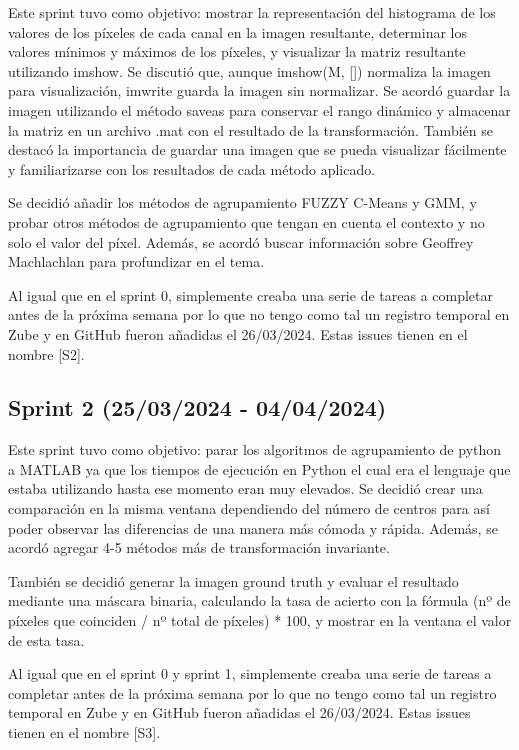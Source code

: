 Este sprint tuvo como objetivo: mostrar la representación del histograma de los valores de los píxeles de cada canal en la imagen resultante, determinar los valores mínimos y máximos de los píxeles, y visualizar la matriz resultante utilizando imshow. Se discutió que, aunque imshow(M, []) normaliza la imagen para visualización, imwrite guarda la imagen sin normalizar. Se acordó guardar la imagen utilizando el método saveas para conservar el rango dinámico y almacenar la matriz en un archivo .mat con el resultado de la transformación. También se destacó la importancia de guardar una imagen que se pueda visualizar fácilmente y familiarizarse con los resultados de cada método aplicado.

Se decidió añadir los métodos de agrupamiento FUZZY C-Means y GMM, y probar otros métodos de agrupamiento que tengan en cuenta el contexto y no solo el valor del píxel. Además, se acordó buscar información sobre Geoffrey Machlachlan para profundizar en el tema.

Al igual que en el sprint 0, simplemente creaba una serie de tareas a completar antes de la próxima semana por lo que no tengo como tal un registro temporal en Zube y en GitHub fueron añadidas el 26/03/2024. Estas issues tienen en el nombre [S2].

\subsection{Sprint 2 (25/03/2024 - 04/04/2024)}\label{sprint-2}

Este sprint tuvo como objetivo: parar los algoritmos de agrupamiento de python a MATLAB ya que los tiempos de ejecución en Python el cual era el lenguaje que estaba utilizando hasta ese momento eran muy elevados. Se decidió crear una comparación en la misma ventana dependiendo del número de centros para así poder observar las diferencias de una manera más cómoda y rápida. Además, se acordó agregar 4-5 métodos más de transformación invariante.

También se decidió generar la imagen ground truth y evaluar el resultado mediante una máscara binaria, calculando la tasa de acierto con la fórmula (nº de píxeles que coinciden / nº total de píxeles) * 100, y mostrar en la ventana el valor de esta tasa.

Al igual que en el sprint 0 y sprint 1,  simplemente creaba una serie de tareas a completar antes de la próxima semana por lo que no tengo como tal un registro temporal en Zube y en GitHub fueron añadidas el 26/03/2024. Estas issues tienen en el nombre [S3].

